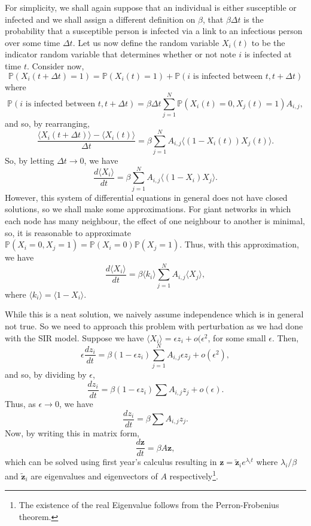 \documentclass[
]{article}
\theoremstyle{definition}
\theoremstyle{definition}
\begin{document}
For simplicity, we shall again suppose that an individual is either
susceptible or infected and we shall assign a different definition on
\(\beta\), that \(\beta \Delta t\) is the probability that a susceptible
person is infected via a link to an infectious person over some time
\(\Delta t\). Let us now define the random variable \(X_i(t)\) to be the
indicator random variable that determines whether or not note \(i\) is
infected at time \(t\). Consider now,
\[\mathbb{P}(X_i(t + \Delta t) = 1) = \mathbb{P}(X_i(t) = 1) + 
  \mathbb{P}(i \text{ is infected between } t, t + \Delta t)\] where
\[\mathbb{P}(i \text{ is infected between } t, t + \Delta t) = 
  \beta \Delta t \sum_{j = 1}^N \mathbb{P}(X_i(t) = 0, X_j(t) = 1) A_{i, j},\]
and so, by rearranging,
\[\frac{\langle X_i(t + \Delta t) \rangle - \langle X_i(t) \rangle}{\Delta t} = 
  \beta \sum_{j = 1}^N A_{i, j} \langle (1 - X_i(t))X_j(t) \rangle.\]
So, by letting \(\Delta t \to 0\), we have
\[\frac{d\langle X_i \rangle}{dt} = 
  \beta \sum_{j = 1}^N A_{i, j}\langle (1 - X_i)X_j \rangle.\] However,
this system of differential equations in general does not have closed
solutions, so we shall make some approximations. For giant networks in
which each node has many neighbour, the effect of one neighbour to
another is minimal, so, it is reasonable to approximate
\(\mathbb{P}(X_i = 0, X_j = 1) = \mathbb{P}(X_i = 0)\mathbb{P}(X_j = 1)\).
Thus, with this approximation, we have
\[\frac{d\langle X_i \rangle}{dt} = 
  \beta \langle k_i \rangle \sum_{j = 1}^N A_{i, j}\langle X_j \rangle,\]
where \(\langle k_i \rangle = \langle 1 - X_i \rangle\).

While this is a neat solution, we naively assume independence which is
in general not true. So we need to approach this problem with
perturbation as we had done with the SIR model. Suppose we have
\(\langle X_i \rangle = \epsilon z_i + o(\epsilon^2\), for some small
\(\epsilon\). Then,
\[\epsilon \frac{dz_i}{dt} = \beta(1 - \epsilon z_i) 
  \sum_{j = 1}^N A_{i, j}\epsilon z_j + o(\epsilon^2),\] and so, by
dividing by \(\epsilon\),
\[\frac{dz_i}{dt} = \beta(1 - \epsilon z_i) \sum A_{i, j} z_j + o(\epsilon).\]
Thus, as \(\epsilon \to 0\), we have
\[\frac{dz_i}{dt} = \beta \sum A_{i, j} z_j.\] Now, by writing this in
matrix form, \[\frac{d\mathbf{z}}{dt} = \beta A \mathbf{z},\] which can
be solved using first year's calculus resulting in
\(\mathbf{z} = \tilde{\mathbf{z}}_i e^{\lambda_i t}\) where
\(\lambda_i / \beta\) and \(\tilde{\mathbf{z}}_i\) are eigenvalues and
eigenvectors of \(A\)
respectively\footnote{The existence of the real Eigenvalue follows from the 
Perron-Frobenius theorem.}.
\end{document}
